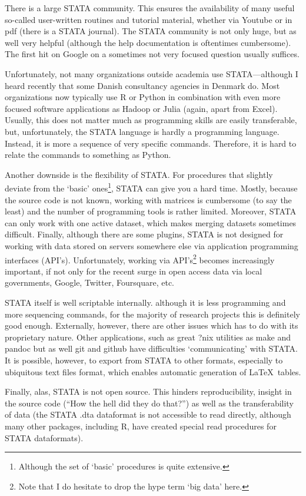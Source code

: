 \documentclass[fleqn,10pt]{SelfArx} %
\begin{document}
There is a large STATA community. This ensures the availability of many useful so-called user-written routines and tutorial material, whether via Youtube or in pdf (there is a STATA journal). The STATA community is not only huge, but as well very helpful (although the help documentation is oftentimes cumbersome). The first hit on Google on a sometimes not very focused question usually suffices.

Unfortunately, not many organizations outside academia use STATA---although I heard recently that some Danish consultancy agencies in Denmark do. Most organizations now typically use R or Python in combination with even more focused software applications as Hadoop or Julia (again, apart from Excel). Usually, this does not matter much as programming skills are easily transferable, but, unfortunately, the STATA language is hardly a programming language. Instead, it is more a sequence of very specific commands. Therefore, it is hard to relate the commands to something as Python.

Another downside is the flexibility of STATA. For procedures that slightly deviate from the `basic' ones\footnote{Although the set of `basic' procedures is quite extensive.}, STATA can give you a hard time. Mostly, because the source code is not known, working with matrices is cumbersome (to say the least) and the number of programming tools is rather limited. Moreover, STATA can only work with one active dataset, which makes merging datasets sometimes difficult. Finally, although there are some plugins, STATA is not designed for working with data stored on servers somewhere else via application programming interfaces (API's). Unfortunately, working via API's\footnote{Note that I do hesitate to drop the hype term `big data' here.} becomes increasingly important, if not only for the recent surge in open access data via local governments, Google, Twitter, Foursquare, etc.

STATA itself is well scriptable internally. although it is less programming and more sequencing commands, for the majority of research projects this is definitely good enough. Externally, however, there are other issues which has to do with its proprietary nature. Other applications, such as great ?nix utilities as make and pandoc but as well git and github have difficulties `communicating' with STATA. It is possible, however, to export from STATA to other formats, especially to ubiquitous text files format, which enables automatic generation of \LaTeX\ tables.

Finally, alas, STATA is not open source. This hinders reproducibility, insight in the source code (``How the hell did they do that?'') as well as the transferability of data (the STATA .dta dataformat is not accessible to read directly, although many other packages, including R, have created special read procedures for STATA dataformats).
\end{document}
